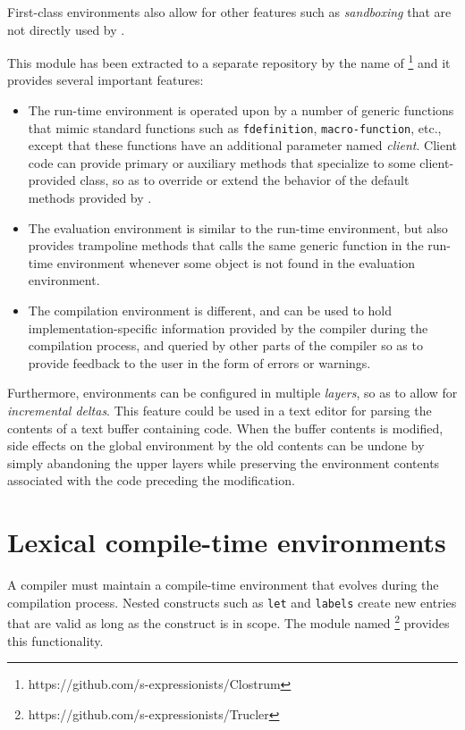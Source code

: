 First-class environments also allow for other features such as
\emph{sandboxing} that are not directly used by \sysname{}.

This module has been extracted to a separate repository by the name of
\clostrum{}%
\footnote{https://github.com/s-expressionists/Clostrum} and it
provides several important features:

\begin{itemize}
\item The run-time environment is operated upon by a number of generic
  functions that mimic standard \commonlisp{} functions such as
  \texttt{fdefinition}, \texttt{macro-function}, etc., except that
  these functions have an additional parameter named \emph{client}.
  Client code can provide primary or auxiliary methods that specialize
  to some client-provided class, so as to override or extend the
  behavior of the default methods provided by \clostrum{}.
\item The evaluation environment is similar to the run-time
  environment, but also provides trampoline methods that calls the
  same generic function in the run-time environment whenever some
  object is not found in the evaluation environment.
\item The compilation environment is different, and can be used to
  hold imple\-mentation-specific information provided by the compiler
  during the compilation process, and queried by other parts of the
  compiler so as to provide feedback to the user in the form of errors
  or warnings.
\end{itemize}

Furthermore, \clostrum{} environments can be configured in multiple
\emph{layers}, so as to allow for \emph{incremental deltas}.  This
feature could be used in a text editor for parsing the contents of a
text buffer containing \commonlisp{} code.  When the buffer contents
is modified, side effects on the global environment by the old
contents can be undone by simply abandoning the upper layers while
preserving the environment contents associated with the code preceding
the modification.

\section{Lexical compile-time environments}
\label{sec-lexical-compile-time-environments}

A \commonlisp{} compiler must maintain a compile-time environment that
evolves during the compilation process.  Nested constructs such as
\texttt{let} and \texttt{labels} create new entries that are valid as
long as the construct is in scope. The module named \trucler{}%
\footnote{https://github.com/s-expressionists/Trucler} provides this
functionality.

